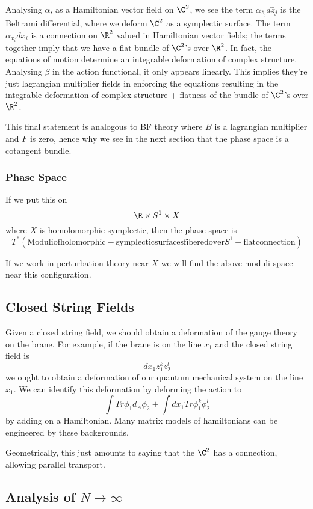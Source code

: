 \documentclass[12pt]{amsart}
\begin{document}
Analysing $\alpha$, as a Hamiltonian vector field on $\C^2$, we see the
term $\alpha_{\bar{z}_j}d\bar{z}_j$ is the Beltrami differential, where we
deform $\C^2$ as a symplectic surface. The term $\alpha_{x_i}dx_i$ is a
connection on $\R^2$ valued in Hamiltonian vector fields; the terms together
imply that we have a flat bundle of $\C^2$'s over $\R^2$. In fact, the
equations of motion determine an integrable deformation of complex structure.
Analysing $\beta$ in the action functional, it only appears linearly. This
implies they're just lagrangian multiplier fields in enforcing the equations
resulting in the integrable deformation of complex structure + flatness of the
bundle of $\C^2$'s over $\R^2$.
\begin{rmk}
  This final statement is analogous to BF theory where $B$ is a lagrangian
  multiplier and $F$ is zero, hence why we see in the next section that the
  phase space is a cotangent bundle.
\end{rmk}

\subsubsection{Phase Space}
If we put this on $$\R \times S^1 \times X$$ where $X$ is homolomorphic
symplectic, then the phase space is $$T^*(\mathrm{Moduli of
holomorphic-symplectic surfaces fibered over} S^1 + \mathrm{flat
connection})$$
\begin{rmk}
  If we work in perturbation theory near $X$ we will find the above moduli
  space near this configuration.
\end{rmk}

\subsection{Closed String Fields}

Given a closed string field, we should obtain a deformation of the gauge theory
on the brane. For example, if the brane is on the line $x_1$ and the closed
string  field is $$dx_1 z_1^k z_2^l$$ we ought to obtain a deformation of our
quantum mechanical system on the line $x_1$. We can identify this deformation
by deforming the action to $$\int Tr \phi_1 d_A \phi_2 + \int dx_1 Tr \phi_1^k
\phi_2^l$$ by adding on a Hamiltonian. Many matrix models of hamiltonians can
be engineered by these backgrounds.

\begin{rmk}
  Geometrically, this just amounts to saying that the $\C^2$ has a connection,
  allowing parallel transport.
\end{rmk}

\subsection{Analysis of $N \rightarrow \infty$}
\end{document}

